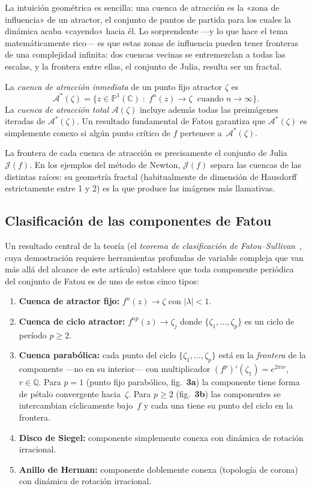 \documentclass[11pt,a4paper]{article}
\theoremstyle{plain}
\theoremstyle{definition}
\theoremstyle{remark}
\newcommand{\Puno}{\mathbb{P}^1(\mathbb{C})}
\begin{document}
La intuición geométrica es sencilla: una cuenca de atracción es la «zona de influencia»
de un atractor, el conjunto de puntos de partida para los cuales la dinámica acaba
«cayendo» hacia él. Lo sorprendente ---y lo que hace el tema matemáticamente rico--- es
que estas zonas de influencia pueden tener fronteras de una complejidad infinita: dos
cuencas vecinas se entremezclan a todas las escalas, y la frontera entre ellas, el
conjunto de Julia, resulta ser un fractal.

La \emph{cuenca de atracción inmediata} de un punto fijo atractor
$\zeta$ es
\[
  \mathcal{A}^*(\zeta)=\{z\in\Puno\;:\;f^n(z)\to\zeta\;\text{ cuando }n\to\infty
\}.
\]
La \emph{cuenca de atracción total} $\mathcal{A}(\zeta)$ incluye
además todas las preimágenes iteradas de $\mathcal{A}^*(\zeta)$.
Un resultado fundamental de Fatou garantiza que $\mathcal{A}^*(\zeta)$
es simplemente conexo si algún punto crítico de $f$ pertenece a~$\mathcal{A}^*(\zeta)$.

La frontera de cada cuenca de atracción es precisamente el conjunto
de Julia $\mathcal{J}(f)$.
En los ejemplos del método de Newton, $\mathcal{J}(f)$ separa las
cuencas de las distintas raíces: su geometría fractal (habitualmente
de dimensión de Hausdorff estrictamente entre 1 y 2) es la que produce
las imágenes más llamativas.

\subsection{Clasificación de las componentes de Fatou}

Un resultado central de la teoría (el \emph{teorema de clasificación de Fatou--Sullivan}~\cite{Milnor2006}, cuya demostración requiere herramientas profundas de variable compleja que van más allá del alcance de este artículo) establece que toda
componente periódica del conjunto de Fatou es de uno de estos cinco
tipos:

\begin{enumerate}
  \item \textbf{Cuenca de atractor fijo:} $f^n(z)\to\zeta$ con $|\lambda|<1$.
  \item \textbf{Cuenca de ciclo atractor:} $f^{np}(z)\to\zeta_j$ donde
        $\{\zeta_1,\ldots,\zeta_p\}$ es un ciclo de período $p\geq 2$.
  \item \textbf{Cuenca parabólica:} cada punto del ciclo
        $\{\zeta_1,\ldots,\zeta_p\}$ está en la \emph{frontera} de la
        componente ---no en su interior--- con multiplicador
        $(f^p)'(\zeta_1)=e^{2\pi ir}$, $r\in\mathbb{Q}$.
        Para $p=1$ (punto fijo parabólico, fig.~\textbf{3a}) la componente
        tiene forma de pétalo convergente hacia~$\zeta$.
        Para $p\geq 2$ (fig.~\textbf{3b}) las componentes se intercambian
        cíclicamente bajo~$f$ y cada una tiene su punto del ciclo en la
        frontera.
  \item \textbf{Disco de Siegel:} componente simplemente conexa con
        dinámica de rotación irracional.
  \item \textbf{Anillo de Herman:} componente doblemente conexa (topología de corona)
        con dinámica de rotación irracional.
\end{enumerate}
\end{document}
